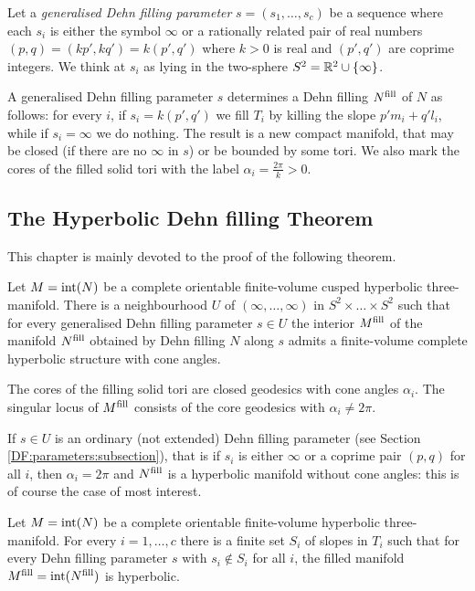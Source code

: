 Let a \emph{generalised Dehn filling parameter} $s=(s_1,\ldots, s_c)$ be a sequence where each $s_i$ is either the symbol $\infty$ or a rationally related pair of real numbers $(p,q) = (kp',kq') = k(p',q')$ where $k>0$ is real and $(p',q')$ are coprime integers. We think at $s_i$ as lying in the two-sphere $S^2 = \mathbb{R}^2 \cup \{\infty\}$.

A generalised Dehn filling parameter $s$ determines a Dehn filling $N^{\rm fill}$ of $N$ as follows:
for every $i$, if $s_i=k(p',q')$ we fill $T_i$ by killing the slope $p'm_i + q'l_i$, while if $s_i=\infty$ we do nothing. The result is a new compact manifold, that may be closed (if there are no $\infty$ in $s$) or be bounded by some tori. We also mark the cores of the filled solid tori with the label $\alpha_i = \frac{2\pi} k>0$. 

\subsection{The Hyperbolic Dehn filling Theorem}
This chapter is mainly devoted to the proof of the following theorem. 

\begin{teo} \label{DF:teo} \label{hyperbolic:Dehn:filling:teo}
Let $M = {\rm int}(N)$ be a complete orientable finite-volume cusped hyperbolic three-manifold. There is a neighbourhood $U$ of $(\infty,\ldots,\infty)$ in $S^2\times \ldots \times S^2$ such that for every generalised Dehn filling parameter $s \in U$ the interior $M^{\rm fill}$ of the manifold $N^{\rm fill}$ obtained by Dehn filling $N$ along $s$ admits a finite-volume complete hyperbolic structure with cone angles. 

The cores of the filling solid tori are closed geodesics with cone angles $\alpha_i$. The singular locus of $M^{\rm fill}$ consists of the core geodesics with $\alpha_i \neq 2\pi$.
\end{teo}

If $s\in U$ is an ordinary (not extended) Dehn filling parameter (see Section \ref{DF:parameters:subsection}), that is if $s_i$ is either $\infty$ or a coprime pair $(p,q)$ for all $i$, then $\alpha_i = 2\pi$ and $N^{\rm fill}$ is a hyperbolic manifold without cone angles: this is of course the case of most interest. 

\begin{cor}
Let $M = {\rm int}(N)$ be a complete orientable finite-volume hyperbolic three-manifold. For every $i=1,\ldots, c$ there is a finite set $S_i$ of slopes in $T_i$ such that for every Dehn filling parameter $s$ with $s_i \not \in S_i$ for all $i$, the filled manifold $M^{\rm fill} = {\rm int}(N^{\rm fill})$ is hyperbolic.
\end{cor}

